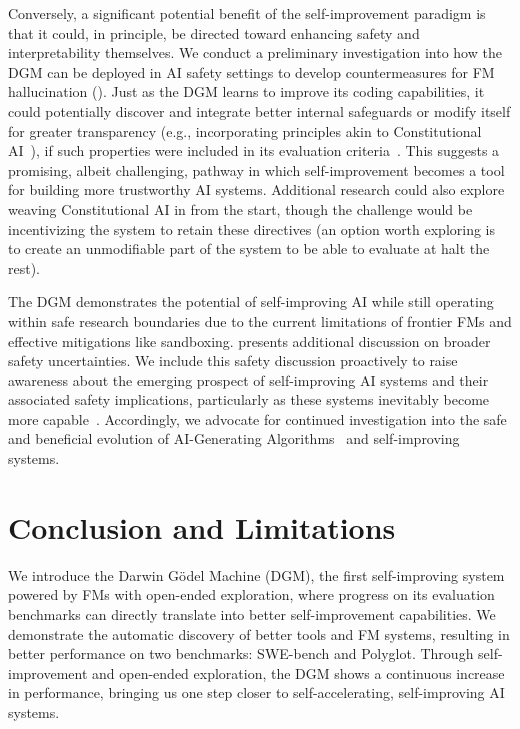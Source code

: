 \documentclass{article} %
\begin{document}
Conversely, a significant potential benefit of the self-improvement paradigm is that it could, in principle, be directed toward enhancing safety and interpretability themselves. We conduct a preliminary investigation into how the DGM can be deployed in AI safety settings to develop countermeasures for FM hallucination (). Just as the DGM learns to improve its coding capabilities, it could potentially discover and integrate better internal safeguards or modify itself for greater transparency (e.g., incorporating principles akin to Constitutional AI~\citep{bai2022constitutional}), if such properties were included in its evaluation criteria~\citep{rosser2025agentbreeder}. This suggests a promising, albeit challenging, pathway in which self-improvement becomes a tool for building more trustworthy AI systems. Additional research could also explore weaving Constitutional AI in from the start, though the challenge would be incentivizing the system to retain these directives (an option worth exploring is to create an unmodifiable part of the system to be able to evaluate at halt the rest).

The DGM demonstrates the potential of self-improving AI while still operating within safe research boundaries due to the current limitations of frontier FMs and effective mitigations like sandboxing.  presents additional discussion on broader safety uncertainties. We include this safety discussion proactively to raise awareness about the emerging prospect of self-improving AI systems and their associated safety implications, particularly as these systems inevitably become more capable~\citep{yudkowsky2008artificial, bostrom2002a,ecoffet2020open, bengio2024managing,clune2019ai}. Accordingly, we advocate for continued investigation into the safe and beneficial evolution of AI-Generating Algorithms~\citep{clune2019ai} and self-improving systems.

\section{Conclusion and Limitations}
\label{sec:conclusion}

We introduce the Darwin G\"odel Machine (DGM), the first self-improving system powered by FMs with open-ended exploration, where progress on its evaluation benchmarks can directly translate into better self-improvement capabilities. We demonstrate the automatic discovery of better tools and FM systems, resulting in better performance on two benchmarks: SWE-bench and Polyglot. Through self-improvement and open-ended exploration, the DGM shows a continuous increase in performance, bringing us one step closer to self-accelerating, self-improving AI systems.
\end{document}

